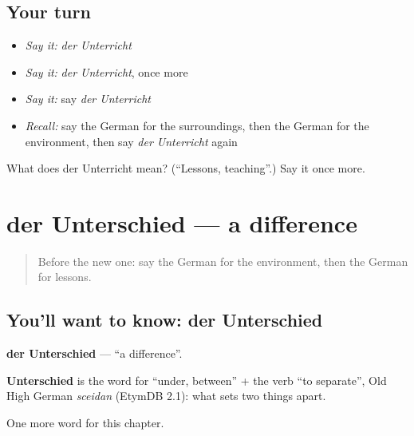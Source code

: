 \subsection*{Your turn}
\begin{itemize}
\raggedright
  \item \emph{Say it:} \emph{der Unterricht}
  \item \emph{Say it:} \emph{der Unterricht}, once more
  \item \emph{Say it:} say \emph{der Unterricht}
  \item \emph{Recall:} say the German for the surroundings, then the German for the environment, then say \emph{der Unterricht} again
\end{itemize}

\begin{tcolorbox}[breakable,colback=teal!4,colframe=teal!35!black,title={Before you move on}]
What does der Unterricht mean? (\textquotedblleft{}Lessons, teaching\textquotedblright{}.) Say it once more.
\end{tcolorbox}
\section[der Unterschied]{der Unterschied — a difference}

\label{lesson:GE-C241-unterschied}



\begin{quote}
Before the new one: say the German for the environment, then the German for lessons.
\end{quote}

\subsection*{You'll want to know: der Unterschied}
\textbf{der Unterschied} — \textquotedblleft{}a difference\textquotedblright{}.

\begin{cousinweb}
\textbf{Unterschied} is the word for \textquotedblleft{}under, between\textquotedblright{} + the verb \textquotedblleft{}to separate\textquotedblright{}, Old High German \emph{sceidan} (EtymDB 2.1): what sets two things apart.
\end{cousinweb}

\begin{grammarlens}[title={What you've built}]
One more word for this chapter.
\end{grammarlens}

